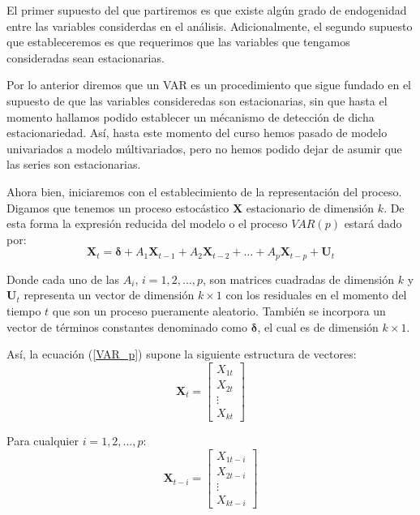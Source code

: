 \documentclass[
  a4paper,
]{article}
\begin{document}
El primer supuesto del que partiremos es que existe algún grado de
endogenidad entre las variables considerdas en el análisis.
Adicionalmente, el segundo supuesto que estableceremos es que requerimos
que las variables que tengamos consideradas sean estacionarias.

Por lo anterior diremos que un VAR es un procedimiento que sigue fundado
en el supuesto de que las variables consideredas son estacionarias, sin
que hasta el momento hallamos podido establecer un mécanismo de
detección de dicha estacionariedad. Así, hasta este momento del curso
hemos pasado de modelo univariados a modelo múltivariados, pero no hemos
podido dejar de asumir que las series son estacionarias.

Ahora bien, iniciaremos con el establecimiento de la representación del
proceso. Digamos que tenemos un proceso estocástico \(\mathbf{X}\)
estacionario de dimensión \(k\). De esta forma la expresión reducida del
modelo o el proceso \(VAR(p)\) estará dado por: \[
    \mathbf{X}_t = \mathbf{\delta} + A_1 \mathbf{X}_{t-1} + A_2 \mathbf{X}_{t-2} + \ldots + A_p \mathbf{X}_{t-p} + \mathbf{U}_{t}
    \label{VAR_p}
\]

Donde cada uno de las \(A_i\), \(i = 1, 2, \ldots, p\), son matrices
cuadradas de dimensión \(k\) y \(\mathbf{U}_t\) representa un vector de
dimensión \(k \times 1\) con los residuales en el momento del tiempo
\(t\) que son un proceso pueramente aleatorio. También se incorpora un
vector de términos constantes denominado como \(\mathbf{\delta}\), el
cual es de dimensión \(k \times 1\).

Así, la ecuación (\ref{VAR_p}) supone la siguiente estructura de
vectores: \begin{equation*}
    \mathbf{X}_t = 
    \begin{bmatrix}
    X_{1t} \\ X_{2t} \\ \vdots \\ X_{kt}
    \end{bmatrix}
\end{equation*}

Para cualquier \(i = 1, 2, \ldots, p\): \begin{equation*}
    \mathbf{X}_{t-i} = 
    \begin{bmatrix}
    X_{1t-i} \\ X_{2t-i} \\ \vdots \\ X_{kt-i}
    \end{bmatrix}
\end{equation*}
\end{document}
